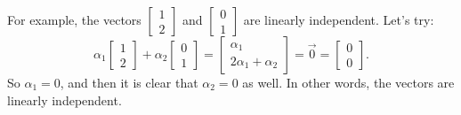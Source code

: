 For example, the vectors
$\left[ \begin{smallmatrix} 1 \\ 2 \end{smallmatrix} \right]$
and
$\left[ \begin{smallmatrix} 0 \\ 1 \end{smallmatrix} \right]$
are linearly independent.  Let's try:
\begin{equation*}
\alpha_1
\begin{bmatrix} 1 \\ 2 \end{bmatrix}
+
\alpha_2
\begin{bmatrix} 0 \\ 1 \end{bmatrix}
=
\begin{bmatrix} \alpha_1 \\ 2 \alpha_1 + \alpha_2 \end{bmatrix}
=
\vec{0} =
\begin{bmatrix} 0 \\ 0 \end{bmatrix} .
\end{equation*}
So $\alpha_1 = 0$, and then it is clear that $\alpha_2 = 0$ as well.  In
other words, the vectors are linearly independent.

